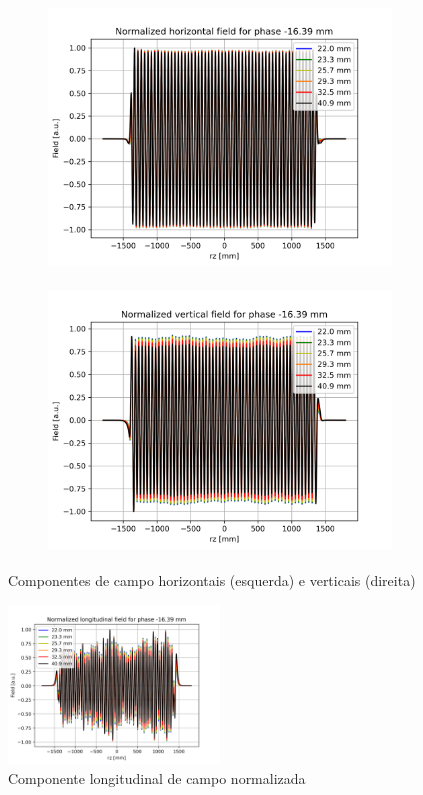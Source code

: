 \documentclass[a4paper,12pt]{article}
\begin{document}
\begin{figure}[H]
\begin{subfigure}{0.5\textwidth}
\includegraphics[width=0.9\linewidth, height=7cm]{figs/phase-16 Bx.png} 
\label{fig:subim1-16}
\end{subfigure}
\begin{subfigure}{0.5\textwidth}
\includegraphics[width=0.9\linewidth, height=7cm]{figs/phase-16 By.png}
\label{fig:subim2-16}
\end{subfigure}
\caption{Componentes de campo horizontais (esquerda) e verticais (direita)}
\label{fig:bx_by-16}
\end{figure}

\begin{figure}[H]
\begin{center}
\includegraphics[width=0.5\textwidth]{figs/phase-16 Bz.png}
\caption{Componente longitudinal de campo normalizada}
\label{fig:bz-16}
\end{center}
\end{figure}
\end{document}
